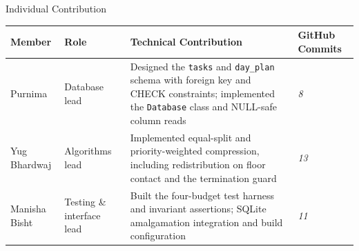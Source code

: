 \documentclass[aspectratio=169,11pt]{beamer}
\newcommand{\placeholder}[1]{%
\textit{\color{GEUGrey}#1}
}
\begin{document}
\begin{frame}{Individual Contribution}

\scriptsize

\begin{center}

\renewcommand{\arraystretch}{1.35}

\begin{tabularx}{.96\textwidth}
{@{}p{2.4cm}p{2.0cm}X p{1.3cm}@{}}

\toprule
Member &
Role &
Technical Contribution &
GitHub Commits\\
\midrule

Purnima &
Database lead &
Designed the \texttt{tasks} and \texttt{day\_plan} schema with foreign key
and CHECK constraints; implemented the \texttt{Database} class and NULL-safe
column reads &
\placeholder{8}\\

Yug Bhardwaj &
Algorithms lead &
Implemented equal-split and priority-weighted compression, including
redistribution on floor contact and the termination guard &
\placeholder{13}\\

Manisha Bisht &
Testing \& interface lead &
Built the four-budget test harness and invariant assertions; SQLite
amalgamation integration and build configuration &
\placeholder{11}\\

\bottomrule

\end{tabularx}

\end{center}

\vspace{3mm}


\end{frame}
\end{document}
